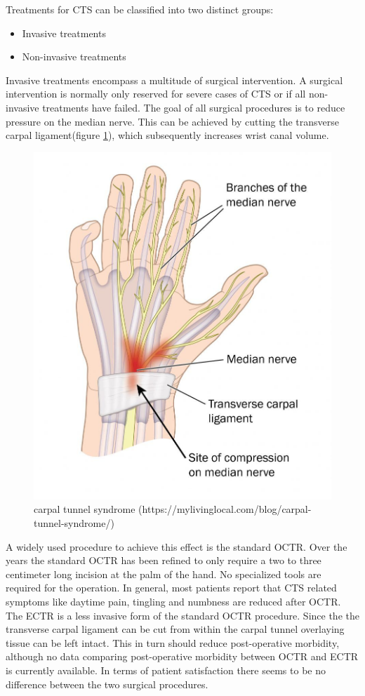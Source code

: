 Treatments for \gls{CTS} can be classified into two distinct groups:
\begin{itemize}
	\item Invasive treatments
	\item Non-invasive treatments
\end{itemize}
Invasive treatments encompass a multitude of surgical intervention.
A surgical intervention is normally only reserved for severe cases of \gls{CTS} or if all non-invasive treatments have failed\cite{scholten2007surgical}.
The goal of all surgical procedures is to reduce pressure on the median nerve.
This can be achieved by cutting the transverse carpal ligament(figure \ref{fig:carpal-tunnel-syndrome}), which subsequently increases wrist canal volume.
\begin{figure}
	\centering
	\includegraphics[width=0.6\linewidth]{figures/carpal-tunnel-syndrome}
	\caption{carpal tunnel syndrome (https://mylivinglocal.com/blog/carpal-tunnel-syndrome/)}
	\label{fig:carpal-tunnel-syndrome}
\end{figure}
A widely used procedure to achieve this effect is the standard \gls{OCTR}.
Over the years the standard \gls{OCTR} has been refined to only require a two to three centimeter long incision at the palm of the hand\cite{scholten2007surgical}.
No specialized tools are required for the operation.
In general, most patients report that \gls{CTS} related symptoms like daytime pain, tingling and numbness are reduced after \gls{OCTR}\cite{louie2013outcomes}.
The \gls{ECTR} is a less invasive form of the standard \gls{OCTR} procedure.
Since the the transverse carpal ligament can be cut from within the carpal tunnel overlaying tissue can be left intact.
This in turn should reduce post-operative morbidity\cite{scholten2007surgical}, although no data comparing post-operative morbidity between \gls{OCTR} and \gls{ECTR} is currently available.
In terms of patient satisfaction there seems to be no difference between the two surgical procedures\cite{atroshi2015extended}.

